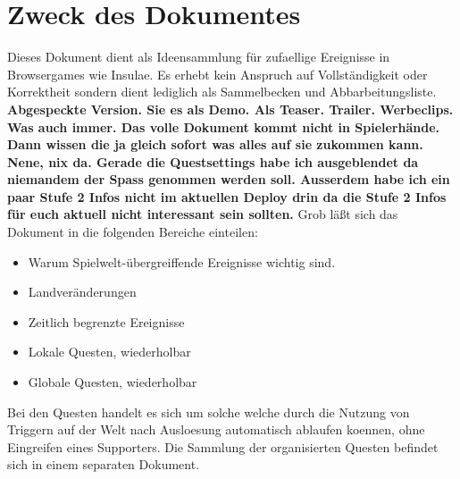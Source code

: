 \chapter{Zweck des Dokumentes}
Dieses Dokument dient als Ideensammlung f{\"u}r zufaellige Ereignisse in
Browsergames wie Insulae. Es erhebt kein Anspruch auf Vollst{\"a}ndigkeit oder
Korrektheit sondern dient lediglich als Sammelbecken und Abbarbeitungsliste.
\newline\newline
\textbf{Abgespeckte Version. Sie es als Demo. Als Teaser. Trailer. Werbeclips.
Was auch immer. Das volle Dokument kommt nicht in Spielerh{\"a}nde. Dann wissen
die ja gleich sofort was alles auf sie zukommen kann. Nene, nix da.
Gerade die Questsettings habe ich ausgeblendet da niemandem der Spass
genommen werden soll. Ausserdem habe ich ein paar Stufe 2 Infos nicht im
aktuellen Deploy drin da die Stufe 2 Infos f{\"u}r euch aktuell nicht interessant sein sollten.}
\newline\newline
Grob l{\"a}\ss t sich das Dokument in die folgenden Bereiche einteilen:\newline
\begin{itemize}
\item {Warum Spielwelt-{\"u}bergreiffende Ereignisse wichtig sind.}
\item {Landver{\"a}nderungen}
\item {Zeitlich begrenzte Ereignisse}
\item {Lokale Questen, wiederholbar}
\item {Globale Questen, wiederholbar}
\end{itemize}

Bei den Questen handelt es sich um solche welche durch die Nutzung von Triggern
auf der Welt nach Ausloesung automatisch ablaufen koennen, ohne Eingreifen eines
Supporters. Die Sammlung der organisierten Questen befindet sich in einem
separaten Dokument.
